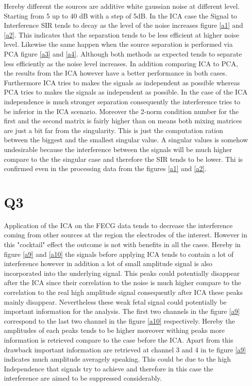 Hereby different the sources are additive white gaussian noise at different level. Starting from 5 up to 40 dB with a step of 5dB. In the ICA case the Signal to Interference SIR tends to decay as the level of the noise increases figure \ref{a1} and \ref{a2}. This indicates that the separation tends to be less efficient at higher noise level. Likewise the same happen when the source separation is performed via PCA figure \ref{a3} and \ref{a4}. Although both methods as expected tends to separate less efficiently as the noise level increases. In addition comparing ICA to PCA, the results from the ICA however have a better performance in both cases. Furthermore ICA tries to makes the signals as independent as possible whereas PCA tries to makes the signals as independent as possible. In the case of the ICA independence is much stronger separation consequently the interference tries to be inferior in the ICA scenario. Moreover the 2-norm condition number for the first and the second matrix is fairly higher than on means both mixing matrices are just a bit far from the singularity. This is just the computation ration between the biggest and the smallest singular value. A singular values is somehow undesirable because the interference between the signals will be much higher compare to the the singular case and therefore the SIR tends to be lower. Thi is confirmed even in the processing data from the figures \ref{a1} and \ref{a2}.  


\section{Q3}

Application of the ICA on the FECG data tends to decrease the interference coming from other sources at the region the electrodes of the interest. However in this "cocktail" effect the outcome is not with benefits in all the cases. Hereby in figure \ref{a9} and \ref{a10} the signals before applying ICA tends to contain a lot of interference however in addition a lot of small amplitude signal is also incorporated into the underlying signal. This peaks could potentially disappear after the ICA since their correlation to the noise is much higher compare to the correlation to the real high amplitude signal consequently after ICA these peaks mainly disappear.  Nevertheless these weak fetal signal could potentially be important information for the analysis. The first two channels in the figure \ref{a9} correspond to the last two channel in the figure \ref{a10} respectively. Hereby the amplitudes of each peaks tends to be higher moreover withing peaks more information is retrieved compare to the case before the ICA. Apart from this drawback important information are retrieved at channel 3 and 4 in te figure \ref{a9} indicates much amplitude averagely speaking. This could be due to the high Independence that signals try to achieve and therefore in this case the interference are aimed to be suppressed considerably. 

